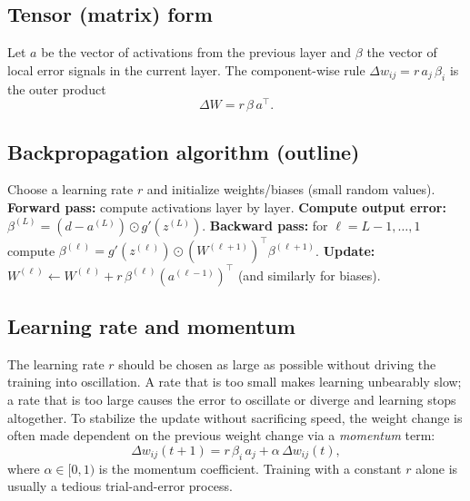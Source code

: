 \documentclass[12pt]{article}
\begin{document}
\subsection{Tensor (matrix) form}
Let $a$ be the vector of activations from the previous layer and $\beta$ the vector of local error signals in the current layer. The component-wise rule $\Delta w_{ij}=r\,a_j\,\beta_i$ is the outer product
\begin{equation}
  \Delta W = r\,\beta\,a^\top.
\end{equation}

\subsection{Backpropagation algorithm (outline)}
\begin{algorithm}[H]
\caption{Backpropagation training for a feed-forward network}
\begin{algorithmic}[1]
\STATE Choose a learning rate $r$ and initialize weights/biases (small random values).
\REPEAT
{}
  \STATE \textbf{Forward pass:} compute activations layer by layer.
  \STATE \textbf{Compute output error:} $\beta^{(L)} = (d-a^{(L)})\odot g'(z^{(L)})$.
  \STATE \textbf{Backward pass:} for $\ell=L-1,\dots,1$ compute
         $\beta^{(\ell)} = g'(z^{(\ell)})\odot\left(W^{(\ell+1)}\right)^\top \beta^{(\ell+1)}$.
  \STATE \textbf{Update:} $W^{(\ell)} \leftarrow W^{(\ell)} + r\, \beta^{(\ell)}(a^{(\ell-1)})^\top$
         (and similarly for biases).
\ENDFOR
{}
\end{algorithmic}
\end{algorithm}

\subsection{Learning rate and momentum}
The learning rate $r$ should be chosen as large as possible without driving the training into oscillation. A rate that is too small makes learning unbearably slow; a rate that is too large causes the error to oscillate or diverge and learning stops altogether. To stabilize the update without sacrificing speed, the weight change is often made dependent on the previous weight change via a \emph{momentum} term:
\begin{equation}
  \Delta w_{ij}(t+1) = r\, \beta_i\, a_j + \alpha\, \Delta w_{ij}(t),
\end{equation}
where $\alpha \in [0,1)$ is the momentum coefficient. Training with a constant $r$ alone is usually a tedious trial-and-error process.
\end{document}
